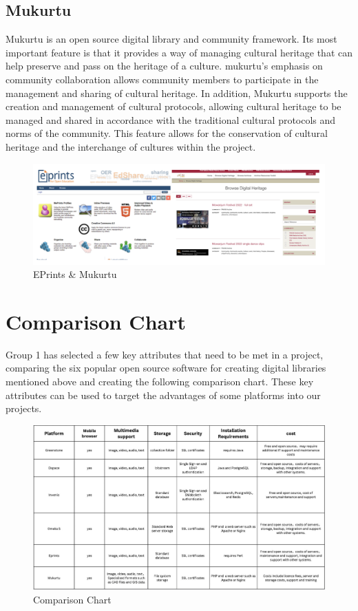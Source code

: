 \subsection{Mukurtu}
Mukurtu is an open source digital library and community framework. Its most important feature is that it provides a way of managing cultural heritage that can help preserve and pass on the heritage of a culture. mukurtu's emphasis on community collaboration allows community members to participate in the management and sharing of cultural heritage. In addition, Mukurtu supports the creation and management of cultural protocols, allowing cultural heritage to be managed and shared in accordance with the traditional cultural protocols and norms of the community. This feature allows for the conservation of cultural heritage and the interchange of cultures within the project\cite{AboutMuk17:online}.


\begin{figure}[htbp]
  \centerline{\includegraphics[width=500pt]{images/a8.jpg}}
  \caption{EPrints \& Mukurtu}
\end{figure}


\section{Comparison Chart}
Group 1 has selected a few key attributes that need to be met in a project, comparing the six popular open source software for creating digital libraries mentioned above and creating the following comparison chart. These key attributes can be used to target the advantages of some platforms into our projects.

\begin{figure}[htbp]
  \centerline{\includegraphics[width=500pt]{images/a2-1.jpg}}
  \caption{Comparison Chart}
\end{figure}


